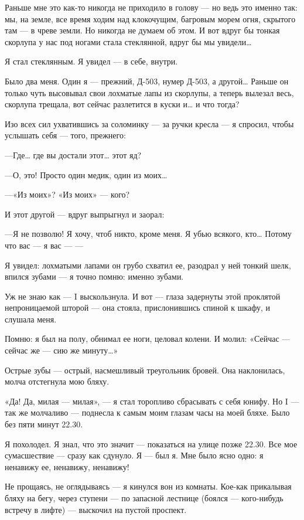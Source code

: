 \documentclass[11pt,openany]{book}
\begin{document}
Раньше мне это как-то никогда не приходило в голову --- но ведь это именно так: мы, на земле, все время ходим над клокочущим, багровым морем огня, скрытого там --- в чреве земли. Но никогда не думаем об этом. И вот вдруг бы тонкая скорлупа у нас под ногами стала стеклянной, вдруг бы мы увидели\ldots{}

Я стал стеклянным. Я увидел --- в себе, внутри.

Было два меня. Один я --- прежний, Д-503, нумер Д-503, а другой\ldots{} Раньше он только чуть высовывал свои лохматые лапы из скорлупы, а теперь вылезал весь, скорлупа трещала, вот сейчас разлетится в куски и\ldots{} и что тогда?

Изо всех сил ухватившись за соломинку --- за ручки кресла --- я спросил, чтобы услышать себя --- того, прежнего:

---Где\ldots{} где вы достали этот\ldots{} этот яд?

---О, это! Просто один медик, один из моих\ldots{}

---«Из моих»? «Из моих» --- кого?

И этот другой --- вдруг выпрыгнул и заорал:

---Я не позволю! Я хочу, чтоб никто, кроме меня. Я убью всякого, кто\ldots{} Потому что вас --- я вас --- ---

Я увидел: лохматыми лапами он грубо схватил ее, разодрал у ней тонкий шелк, впился зубами --- я точно помню: именно зубами.

Уж не знаю как --- I выскользнула. И вот --- глаза задернуты этой проклятой непроницаемой шторой --- она стояла, прислонившись спиной к шкафу, и слушала меня.

Помню: я был на полу, обнимал ее ноги, целовал колени. И молил: «Сейчас --- сейчас же --- сию же минуту\ldots{}»

Острые зубы --- острый, насмешливый треугольник бровей. Она наклонилась, молча отстегнула мою бляху.

«Да! Да, милая --- милая», --- я стал торопливо сбрасывать с себя юнифу. Но I --- так же молчаливо --- поднесла к самым моим глазам часы на моей бляхе. Было без пяти минут 22.30.

Я похолодел. Я знал, что это значит --- показаться на улице позже 22.30. Все мое сумасшествие --- сразу как сдунуло. Я --- был я. Мне было ясно одно: я ненавижу ее, ненавижу, ненавижу!

Не прощаясь, не оглядываясь --- я кинулся вон из комнаты. Кое-как прикалывая бляху на бегу, через ступени --- по запасной лестнице (боялся --- кого-нибудь встречу в лифте) --- выскочил на пустой проспект.
\end{document}
